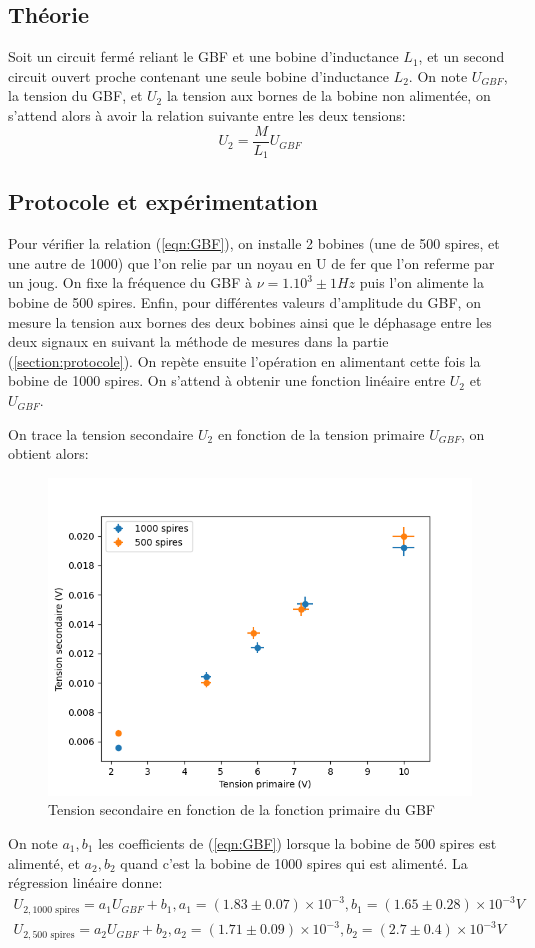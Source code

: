 \documentclass[11pt]{article}
\begin{document}
\subsection{Théorie}
Soit un circuit fermé reliant le GBF et une bobine d'inductance $L_1$, et un second circuit ouvert proche contenant une seule bobine d'inductance $L_2$.
On note $U_{GBF}$, la tension du GBF, et $U_2$ la tension aux bornes de la bobine non alimentée, on s'attend alors à avoir la relation suivante entre les deux tensions:
\begin{equation}
  \label{eqn:GBF}
  U_2 = \frac{M}{L_1}U_{GBF}
\end{equation}

\subsection{Protocole et expérimentation}
Pour vérifier la relation (\ref{eqn:GBF}), on installe 2 bobines (une de 500 spires, et une autre de 1000) que l'on relie par un noyau en U de fer
que l'on referme par un joug. On fixe la fréquence du GBF à $\nu = 1.10^3 \pm 1 Hz$ puis l'on alimente la bobine de 500 spires. Enfin, pour différentes valeurs d'amplitude du GBF, on mesure la tension aux bornes des deux bobines ainsi que le déphasage
entre les deux signaux en suivant la méthode de mesures dans la partie (\ref{section:protocole}). On repète ensuite l'opération en alimentant cette fois la bobine de 1000 spires. On s'attend à obtenir une fonction linéaire entre $U_2$ et $U_{GBF}$.

\break
On trace la tension secondaire $U_2$ en fonction de la tension primaire $U_{GBF}$, on obtient alors:
\begin{figure}[h!]
  \centering
  \includegraphics[width=.5\linewidth]{img/Graph_3.png}
  \caption{Tension secondaire en fonction de la fonction primaire du GBF}
  \label{fig:transformateur}
\end{figure}

On note $a_{1}, b_{1}$ les coefficients de (\ref{eqn:GBF}) lorsque la bobine de 500 spires est alimenté, et $a_{2}, b_{2}$ quand c'est la bobine de 1000 spires qui est alimenté. La régression linéaire donne:
\begin{align*}
  U_{2, 1000 \text{ spires}} = a_1 U_{GBF} + b_1, a_1 = (1.83 \pm 0.07) \times 10^{-3}, b_1 = (1.65 \pm 0.28) \times 10^{-3} V \\
  U_{2, 500 \text{ spires}} = a_2 U_{GBF} + b_2, a_2 = (1.71 \pm 0.09) \times 10^{-3}, b_2 = (2.7 \pm 0.4) \times 10^{-3} V
\end{align*}
\end{document}
